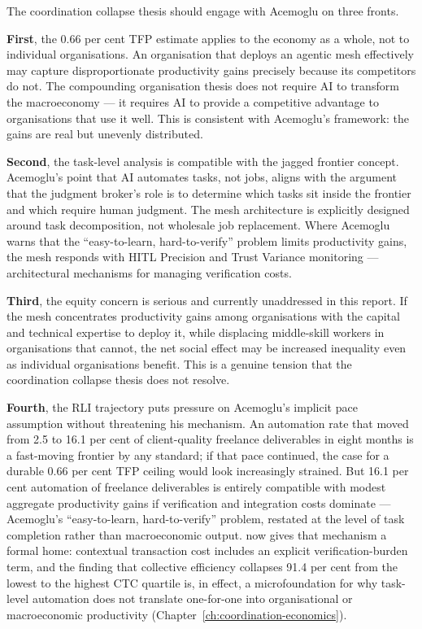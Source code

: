 The coordination collapse thesis should engage with Acemoglu on three fronts.

\textbf{First}, the 0.66 per cent TFP estimate applies to the economy as a whole, not to individual organisations. An organisation that deploys an agentic mesh effectively may capture disproportionate productivity gains precisely because its competitors do not. The compounding organisation thesis does not require AI to transform the macroeconomy --- it requires AI to provide a competitive advantage to organisations that use it well. This is consistent with Acemoglu's framework: the gains are real but unevenly distributed.

\textbf{Second}, the task-level analysis is compatible with the jagged frontier concept. Acemoglu's point that AI automates tasks, not jobs, aligns with the argument that the judgment broker's role is to determine which tasks sit inside the frontier and which require human judgment. The mesh architecture is explicitly designed around task decomposition, not wholesale job replacement. Where Acemoglu warns that the ``easy-to-learn, hard-to-verify'' problem limits productivity gains, the mesh responds with HITL Precision and Trust Variance monitoring --- architectural mechanisms for managing verification costs.

\textbf{Third}, the equity concern is serious and currently unaddressed in this report. If the mesh concentrates productivity gains among organisations with the capital and technical expertise to deploy it, while displacing middle-skill workers in organisations that cannot, the net social effect may be increased inequality even as individual organisations benefit. This is a genuine tension that the coordination collapse thesis does not resolve.

\textbf{Fourth}, the RLI trajectory \parencite{RLI2025, CAIS2026RLI} puts pressure on Acemoglu's implicit pace assumption without threatening his mechanism. An automation rate that moved from 2.5 to 16.1 per cent of client-quality freelance deliverables in eight months is a fast-moving frontier by any standard; if that pace continued, the case for a durable 0.66 per cent TFP ceiling would look increasingly strained. But 16.1 per cent automation of freelance deliverables is entirely compatible with modest aggregate productivity gains if verification and integration costs dominate --- Acemoglu's ``easy-to-learn, hard-to-verify'' problem, restated at the level of task completion rather than macroeconomic output. \textcite{Liu2026} now gives that mechanism a formal home: contextual transaction cost includes an explicit verification-burden term, and the finding that collective efficiency collapses 91.4 per cent from the lowest to the highest CTC quartile is, in effect, a microfoundation for why task-level automation does not translate one-for-one into organisational or macroeconomic productivity (Chapter~\ref{ch:coordination-economics}).

